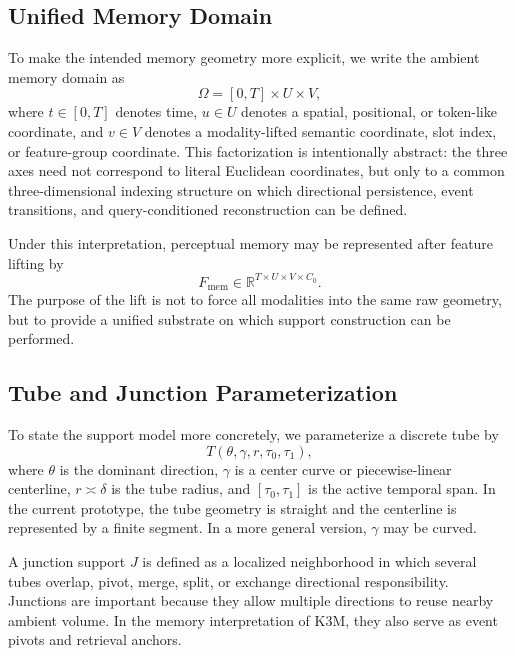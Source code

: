 \documentclass[11pt]{article}
\begin{document}
\subsection{Unified Memory Domain}
To make the intended memory geometry more explicit, we write the ambient memory domain as
\begin{equation}
\Omega = [0,T]\times U\times V,
\end{equation}
where $t\in[0,T]$ denotes time, $u\in U$ denotes a spatial, positional, or token-like coordinate, and $v\in V$ denotes a modality-lifted semantic coordinate, slot index, or feature-group coordinate. This factorization is intentionally abstract: the three axes need not correspond to literal Euclidean coordinates, but only to a common three-dimensional indexing structure on which directional persistence, event transitions, and query-conditioned reconstruction can be defined.

Under this interpretation, perceptual memory may be represented after feature lifting by
\begin{equation}
F_{\mathrm{mem}} \in \mathbb{R}^{T\times U\times V\times C_0}.
\end{equation}
The purpose of the lift is not to force all modalities into the same raw geometry, but to provide a unified substrate on which support construction can be performed.

\subsection{Tube and Junction Parameterization}
To state the support model more concretely, we parameterize a discrete tube by
\begin{equation}
T(\theta,\gamma,r,\tau_0,\tau_1),
\end{equation}
where $\theta$ is the dominant direction, $\gamma$ is a center curve or piecewise-linear centerline, $r\asymp \delta$ is the tube radius, and $[\tau_0,\tau_1]$ is the active temporal span. In the current prototype, the tube geometry is straight and the centerline is represented by a finite segment. In a more general version, $\gamma$ may be curved.

A junction support $J$ is defined as a localized neighborhood in which several tubes overlap, pivot, merge, split, or exchange directional responsibility. Junctions are important because they allow multiple directions to reuse nearby ambient volume. In the memory interpretation of K3M, they also serve as event pivots and retrieval anchors.
\end{document}
